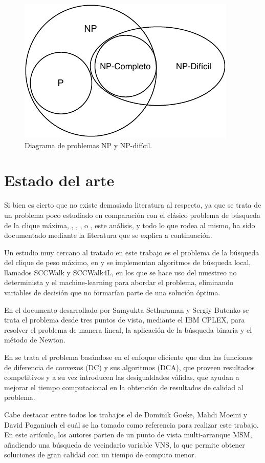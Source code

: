\begin{figure}[H]
	\centering
	\includegraphics{Figures/problemas-np-hard.pdf}
	\caption{Diagrama de problemas NP y NP-difícil.}
	\label{fig:np-dificil}
\end{figure}

\section{Estado del arte}
Si bien es cierto que no existe demasiada literatura al respecto, ya que se trata de un problema poco estudiado en comparación con el clásico problema de búsqueda de la clique máxima, \cite{mcp-batsyn}, \cite{mcp-ryp}, \cite{mcp-neuro}, o \cite{mcp-ants}, este análisis, y todo lo que rodea al mismo, ha sido documentado mediante la literatura que se explica a continuación. 

Un estudio muy cercano al tratado en este trabajo es el problema de la búsqueda del clique de peso máximo, en \cite{mwcp-ls} y \cite{mwcp-ml} se implementan algoritmos de búsqueda local, llamados SCCWalk y SCCWalk4L, en los que se hace uso del muestreo no determinista y el machine-learning para abordar el problema, eliminando variables de decisión que no formarían parte de una solución óptima.

En el documento desarrollado por Samyukta Sethuraman y Sergiy Butenko \cite{mrcp-Sethuraman:2015} se trata el problema desde tres puntos de vista, mediante el IBM CPLEX, para resolver el problema de manera lineal, la aplicación de la búsqueda binaria y el método de Newton.

En \cite{mrcp-moeni} se trata el problema basándose en el enfoque eficiente que dan las funciones de diferencia de convexos (DC) y sus algoritmos (DCA), que proveen resultados competitivos y a su vez introducen las desigualdades válidas, que ayudan a mejorar el tiempo computacional en la obtención de resultados de calidad al problema.

Cabe destacar entre todos los trabajos el de Dominik Goeke, Mahdi Moeini y David Poganiuch \cite{mrcp-GOEKE2017283} el cuál se ha tomado como referencia para realizar este trabajo. En este artículo, los autores parten de un punto de vista multi-arranque \gls{MSM}, añadiendo una búsqueda de vecindario variable \gls{VNS}, lo que permite obtener soluciones de gran calidad con un tiempo de computo menor.


